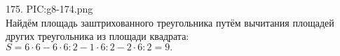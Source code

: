 175. {{PIC:g8-174.png}}\\
Найдём площадь заштрихованного треугольника путём вычитания площадей других треугольника из площади квадрата: $S=6\cdot6-6\cdot6:2-1\cdot6:2-2\cdot6:2=9.$\\
